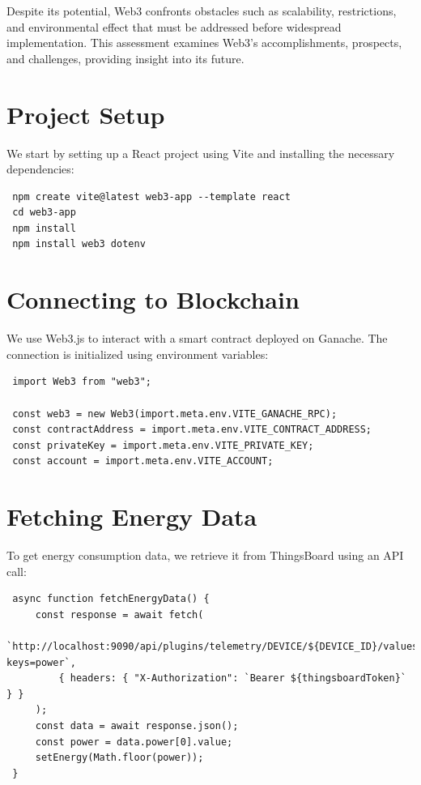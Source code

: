 \documentclass[a4paper,12pt]{report}
\begin{document}
 Despite its potential, Web3 confronts obstacles such as scalability, restrictions, and environmental effect that must be addressed before widespread implementation\cite{lacity2023quiet}\cite{wang2023novel}.  This assessment examines Web3's accomplishments, prospects, and challenges, providing insight into its future.

 \section{Project Setup}
 We start by setting up a React project using Vite and installing the necessary dependencies:
 
 \begin{lstlisting}
 npm create vite@latest web3-app --template react
 cd web3-app
 npm install
 npm install web3 dotenv
 \end{lstlisting}
 
 \section{Connecting to Blockchain}
 We use Web3.js to interact with a smart contract deployed on Ganache. The connection is initialized using environment variables:
 
 \begin{lstlisting}
 import Web3 from "web3";
 
 const web3 = new Web3(import.meta.env.VITE_GANACHE_RPC);
 const contractAddress = import.meta.env.VITE_CONTRACT_ADDRESS;
 const privateKey = import.meta.env.VITE_PRIVATE_KEY;
 const account = import.meta.env.VITE_ACCOUNT;
 \end{lstlisting}
 
 \section{Fetching Energy Data}
 To get energy consumption data, we retrieve it from ThingsBoard using an API call:
 
 \begin{lstlisting}
 async function fetchEnergyData() {
     const response = await fetch(
         `http://localhost:9090/api/plugins/telemetry/DEVICE/${DEVICE_ID}/values/timeseries?keys=power`,
         { headers: { "X-Authorization": `Bearer ${thingsboardToken}` } }
     );
     const data = await response.json();
     const power = data.power[0].value;
     setEnergy(Math.floor(power));
 }
 \end{lstlisting}
 
\end{document}
